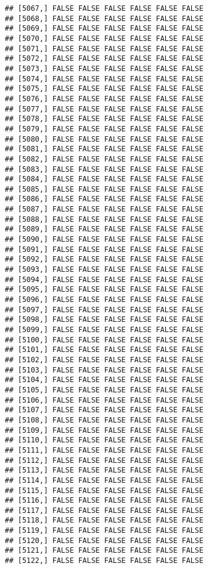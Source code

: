 \documentclass[
]{article}
\begin{document}
\begin{verbatim}
## [5067,] FALSE FALSE FALSE FALSE FALSE FALSE
## [5068,] FALSE FALSE FALSE FALSE FALSE FALSE
## [5069,] FALSE FALSE FALSE FALSE FALSE FALSE
## [5070,] FALSE FALSE FALSE FALSE FALSE FALSE
## [5071,] FALSE FALSE FALSE FALSE FALSE FALSE
## [5072,] FALSE FALSE FALSE FALSE FALSE FALSE
## [5073,] FALSE FALSE FALSE FALSE FALSE FALSE
## [5074,] FALSE FALSE FALSE FALSE FALSE FALSE
## [5075,] FALSE FALSE FALSE FALSE FALSE FALSE
## [5076,] FALSE FALSE FALSE FALSE FALSE FALSE
## [5077,] FALSE FALSE FALSE FALSE FALSE FALSE
## [5078,] FALSE FALSE FALSE FALSE FALSE FALSE
## [5079,] FALSE FALSE FALSE FALSE FALSE FALSE
## [5080,] FALSE FALSE FALSE FALSE FALSE FALSE
## [5081,] FALSE FALSE FALSE FALSE FALSE FALSE
## [5082,] FALSE FALSE FALSE FALSE FALSE FALSE
## [5083,] FALSE FALSE FALSE FALSE FALSE FALSE
## [5084,] FALSE FALSE FALSE FALSE FALSE FALSE
## [5085,] FALSE FALSE FALSE FALSE FALSE FALSE
## [5086,] FALSE FALSE FALSE FALSE FALSE FALSE
## [5087,] FALSE FALSE FALSE FALSE FALSE FALSE
## [5088,] FALSE FALSE FALSE FALSE FALSE FALSE
## [5089,] FALSE FALSE FALSE FALSE FALSE FALSE
## [5090,] FALSE FALSE FALSE FALSE FALSE FALSE
## [5091,] FALSE FALSE FALSE FALSE FALSE FALSE
## [5092,] FALSE FALSE FALSE FALSE FALSE FALSE
## [5093,] FALSE FALSE FALSE FALSE FALSE FALSE
## [5094,] FALSE FALSE FALSE FALSE FALSE FALSE
## [5095,] FALSE FALSE FALSE FALSE FALSE FALSE
## [5096,] FALSE FALSE FALSE FALSE FALSE FALSE
## [5097,] FALSE FALSE FALSE FALSE FALSE FALSE
## [5098,] FALSE FALSE FALSE FALSE FALSE FALSE
## [5099,] FALSE FALSE FALSE FALSE FALSE FALSE
## [5100,] FALSE FALSE FALSE FALSE FALSE FALSE
## [5101,] FALSE FALSE FALSE FALSE FALSE FALSE
## [5102,] FALSE FALSE FALSE FALSE FALSE FALSE
## [5103,] FALSE FALSE FALSE FALSE FALSE FALSE
## [5104,] FALSE FALSE FALSE FALSE FALSE FALSE
## [5105,] FALSE FALSE FALSE FALSE FALSE FALSE
## [5106,] FALSE FALSE FALSE FALSE FALSE FALSE
## [5107,] FALSE FALSE FALSE FALSE FALSE FALSE
## [5108,] FALSE FALSE FALSE FALSE FALSE FALSE
## [5109,] FALSE FALSE FALSE FALSE FALSE FALSE
## [5110,] FALSE FALSE FALSE FALSE FALSE FALSE
## [5111,] FALSE FALSE FALSE FALSE FALSE FALSE
## [5112,] FALSE FALSE FALSE FALSE FALSE FALSE
## [5113,] FALSE FALSE FALSE FALSE FALSE FALSE
## [5114,] FALSE FALSE FALSE FALSE FALSE FALSE
## [5115,] FALSE FALSE FALSE FALSE FALSE FALSE
## [5116,] FALSE FALSE FALSE FALSE FALSE FALSE
## [5117,] FALSE FALSE FALSE FALSE FALSE FALSE
## [5118,] FALSE FALSE FALSE FALSE FALSE FALSE
## [5119,] FALSE FALSE FALSE FALSE FALSE FALSE
## [5120,] FALSE FALSE FALSE FALSE FALSE FALSE
## [5121,] FALSE FALSE FALSE FALSE FALSE FALSE
## [5122,] FALSE FALSE FALSE FALSE FALSE FALSE

\end{verbatim}
\end{document}
